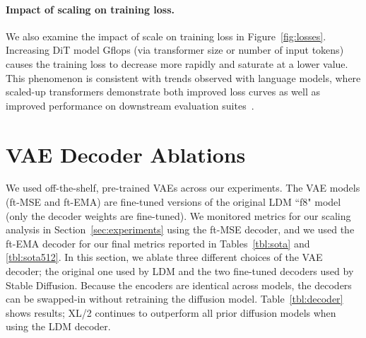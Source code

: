 \documentclass[10pt,twocolumn,letterpaper]{article}
\begin{document}
\paragraph{Impact of scaling on training loss.} We also examine the impact of scale on training loss in Figure~\ref{fig:losses}. Increasing DiT model Gflops (via transformer size or number of input tokens) causes the training loss to decrease more rapidly and saturate at a lower value. This phenomenon is consistent with trends observed with language models, where scaled-up transformers demonstrate both improved loss curves as well as improved performance on downstream evaluation suites~\cite{kaplan2020scaling}.

\section{VAE Decoder Ablations}
We used off-the-shelf, pre-trained VAEs across our experiments. The VAE models (ft-MSE and ft-EMA) are fine-tuned versions of the original LDM ``f8" model (only the decoder weights are fine-tuned). We monitored metrics for our scaling analysis in Section~\ref{sec:experiments} using the ft-MSE decoder, and we used the ft-EMA decoder for our final metrics reported in Tables~\ref{tbl:sota} and \ref{tbl:sota512}. In this section, we ablate three different choices of the VAE decoder; the original one used by LDM and the two fine-tuned decoders used by Stable Diffusion. Because the encoders are identical across models, the decoders can be swapped-in without retraining the diffusion model. Table~\ref{tbl:decoder} shows results; XL/2 continues to outperform all prior diffusion models when using the LDM decoder.


\begin{table}[t]
    \begin{center}
    \begin{small}
     \end{small}
    \end{center}
    \vspace{-4mm}
    \caption{\textbf{Decoder ablation.} We tested different pre-trained VAE decoder weights available at \url{https://huggingface.co/stabilityai/sd-vae-ft-mse}. Different pre-trained decoder weights yield comparable results on ImageNet .}
    \label{tbl:decoder}
\end{table}
\end{document}
